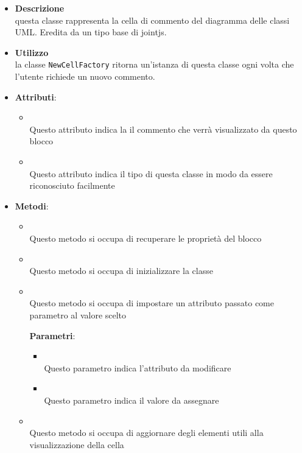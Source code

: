 \label{\nogloxy{swedesigner::client::model::celltypes::class::HxComment}}
\begin{itemize}
\item \textbf{Descrizione}\\
questa classe rappresenta la cella di commento del diagramma delle classi UML. Eredita da un tipo base di jointjs.
\item \textbf{Utilizzo}\\
la classe \texttt{NewCellFactory} ritorna un'istanza di questa classe ogni volta che l'utente richiede un nuovo commento.
\item \textbf{Attributi}:
\begin{itemize}
\item {}
\\ Questo attributo indica la il commento che verrà visualizzato da questo blocco
\item {}
\\ Questo attributo indica il tipo di questa classe in modo da essere riconosciuto facilmente
\end{itemize}
\item \textbf{Metodi}:
\begin{itemize}
\item {}
\\ Questo metodo si occupa di recuperare le proprietà del blocco
\item {}
\\ Questo metodo si occupa di inizializzare la classe

\item {}
\\ Questo metodo si occupa di impostare un attributo passato come parametro al valore scelto

\textbf{Parametri}:
\begin{itemize}
\item {}
\\ Questo parametro indica l'attributo da modificare

\item {}
\\ Questo parametro indica il valore da assegnare

\end{itemize}
\item {}
\\ Questo metodo si occupa di aggiornare degli elementi utili alla visualizzazione della cella

\end{itemize}
\end{itemize}

